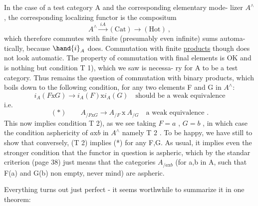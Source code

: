 In the case of a test category\xout{,} A and the corresponding elementary mode-%
lizer $A^{\wedge}$,  the corresponding localizing functor is the compositum
\[ A^{\wedge} \xrightarrow{\ iA\ } (\mathrm{Cat}) \longrightarrow (\mathrm{Hot}) \ , \]
which therefore commutes with finite (presumably even infinite) sums automa-%
tically,  because $\hand{i}_A$ does.  Commutation with finite \uline{products} though does
not look automatic.  The  property of commutation with final
elements is OK and is nothing but condition T 1),  which we saw is necessa-%
ry for A to be a test category.  Thus remains the question of commutation
with binary products,  which boils down to the following condition,  for
any two elements  F and G in $A^{\wedge}$:
\[ i_A(F\mathrm{x}G) \longrightarrow i_A(F)\mathrm{x}i_A(G) \quad \text{should be a weak equivalence} \]
i.e.
\[ (*) \qquad A_{/F\mathrm{x}G} \longrightarrow A_{/F}\ \mathrm{x}\ A_{/G} \quad \text{a weak equivalence .} \]
 This now implies condition T 2),  as we see taking
$F = a$ , $G = b$ ,   in which case the condition   asphericity
of  $a\mathrm{x}b$ in $A^{\wedge}$ namely  T 2 .  To be happy,  we have still to show that
conversely,  (T 2) implies (*)  for any F,G.  As usual,  it implies even the
stronger condition that the functor in question is aspheric,  which by the
standar criterion  (page 38)  just means that the categories $A_{/a\mathrm{x}b}$
(for a,b in A,  such  that F(a) and G(b) non empty,  never mind) are aspheric.

Everything turns out just perfect  -  it seems worthwhile to summarize
it in one theorem:

